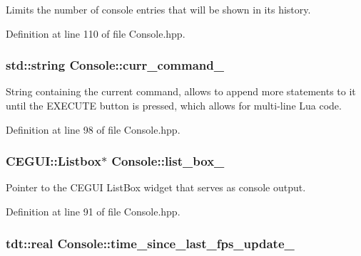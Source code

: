 Limits the number of console entries that will be shown in it\textquotesingle{}s history. 



Definition at line 110 of file Console.\+hpp.

\subsubsection[{\texorpdfstring{curr\+\_\+command\+\_\+}{curr_command_}}]{\setlength{\rightskip}{0pt plus 5cm}std\+::string Console\+::curr\+\_\+command\+\_\+\hspace{0.3cm}{\ttfamily [private]}}\hypertarget{class_console_ae1b7c7ad9e7310a6144612824065de23}{}\label{class_console_ae1b7c7ad9e7310a6144612824065de23}


String containing the current command, allows to append more statements to it until the E\+X\+E\+C\+U\+TE button is pressed, which allows for multi-\/line Lua code. 



Definition at line 98 of file Console.\+hpp.

\subsubsection[{\texorpdfstring{list\+\_\+box\+\_\+}{list_box_}}]{\setlength{\rightskip}{0pt plus 5cm}C\+E\+G\+U\+I\+::\+Listbox$\ast$ Console\+::list\+\_\+box\+\_\+\hspace{0.3cm}{\ttfamily [private]}}\hypertarget{class_console_ac8c64e8d5a77ea61af8cf6c87f6ef1cd}{}\label{class_console_ac8c64e8d5a77ea61af8cf6c87f6ef1cd}


Pointer to the C\+E\+G\+UI List\+Box widget that serves as console output. 



Definition at line 91 of file Console.\+hpp.

\subsubsection[{\texorpdfstring{time\+\_\+since\+\_\+last\+\_\+fps\+\_\+update\+\_\+}{time_since_last_fps_update_}}]{\setlength{\rightskip}{0pt plus 5cm}tdt\+::real Console\+::time\+\_\+since\+\_\+last\+\_\+fps\+\_\+update\+\_\+\hspace{0.3cm}{\ttfamily [private]}}\hypertarget{class_console_a03cc9dd49492a409815f1384597f89dc}{}\label{class_console_a03cc9dd49492a409815f1384597f89dc}


